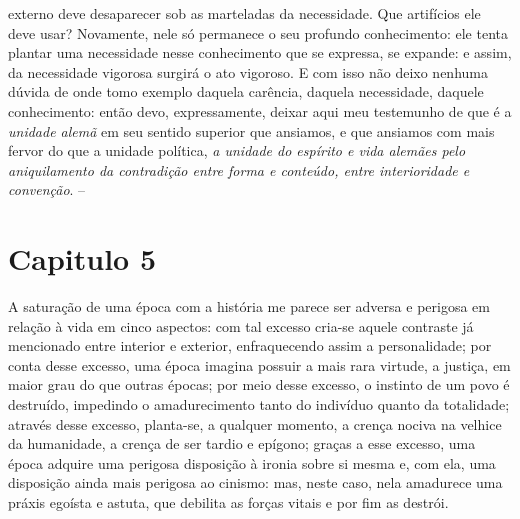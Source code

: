 \begin{enumerate}
\begin{enumerate}
    externo deve desaparecer sob as marteladas da necessidade. Que
    artifícios ele deve usar? Novamente, nele só permanece o seu
    profundo conhecimento: ele tenta plantar uma necessidade nesse
    conhecimento que se expressa, se expande: e assim, da necessidade
    vigorosa surgirá o ato vigoroso. E com isso não deixo nenhuma dúvida
    de onde tomo exemplo daquela carência, daquela necessidade, daquele
    conhecimento: então devo, expressamente, deixar aqui meu testemunho
    de que é a \emph{unidade alemã} em seu sentido superior que
    ansiamos, e que ansiamos com mais fervor do que a unidade política,
    \emph{a unidade do espírito e vida alemães pelo aniquilamento da
    contradição entre forma e conteúdo, entre interioridade e
    convenção}. --
  \end{enumerate}

  \chapter{Capitulo 5}\label{capitulo-5}
\end{enumerate}

A saturação de uma época com a história me parece ser adversa e perigosa
em relação à vida em cinco aspectos: com tal excesso cria-se aquele
contraste já mencionado entre interior e exterior, enfraquecendo assim a
personalidade; por conta desse excesso, uma época imagina possuir a mais
rara virtude, a justiça, em maior grau do que outras épocas; por meio
desse excesso, o instinto de um povo é destruído, impedindo o
amadurecimento tanto do indivíduo quanto da totalidade; através desse
excesso, planta-se, a qualquer momento, a crença nociva na velhice da
humanidade, a crença de ser tardio e epígono; graças a esse excesso, uma
época adquire uma perigosa disposição à ironia sobre si mesma e, com
ela, uma disposição ainda mais perigosa ao cinismo: mas, neste caso,
nela amadurece uma práxis egoísta e astuta, que debilita as forças
vitais e por fim as destrói.

